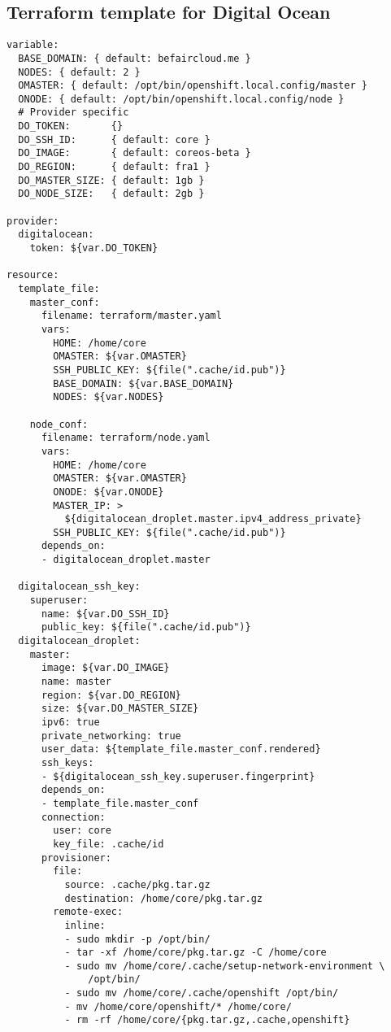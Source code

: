 \subsection{Terraform template for Digital
Ocean}\label{terraform-template-for-digital-ocean}

\begin{verbatim}
variable:
  BASE_DOMAIN: { default: befaircloud.me }
  NODES: { default: 2 }
  OMASTER: { default: /opt/bin/openshift.local.config/master }
  ONODE: { default: /opt/bin/openshift.local.config/node }
  # Provider specific
  DO_TOKEN:       {}
  DO_SSH_ID:      { default: core }
  DO_IMAGE:       { default: coreos-beta }
  DO_REGION:      { default: fra1 }
  DO_MASTER_SIZE: { default: 1gb }
  DO_NODE_SIZE:   { default: 2gb }

provider:
  digitalocean:
    token: ${var.DO_TOKEN}

resource:
  template_file:
    master_conf:
      filename: terraform/master.yaml
      vars:
        HOME: /home/core
        OMASTER: ${var.OMASTER}
        SSH_PUBLIC_KEY: ${file(".cache/id.pub")}
        BASE_DOMAIN: ${var.BASE_DOMAIN}
        NODES: ${var.NODES}

    node_conf:
      filename: terraform/node.yaml
      vars:
        HOME: /home/core
        OMASTER: ${var.OMASTER}
        ONODE: ${var.ONODE}
        MASTER_IP: >
          ${digitalocean_droplet.master.ipv4_address_private}
        SSH_PUBLIC_KEY: ${file(".cache/id.pub")}
      depends_on:
      - digitalocean_droplet.master

  digitalocean_ssh_key:
    superuser:
      name: ${var.DO_SSH_ID}
      public_key: ${file(".cache/id.pub")}
  digitalocean_droplet:
    master:
      image: ${var.DO_IMAGE}
      name: master
      region: ${var.DO_REGION}
      size: ${var.DO_MASTER_SIZE}
      ipv6: true
      private_networking: true
      user_data: ${template_file.master_conf.rendered}
      ssh_keys:
      - ${digitalocean_ssh_key.superuser.fingerprint}
      depends_on:
      - template_file.master_conf
      connection:
        user: core
        key_file: .cache/id
      provisioner:
        file:
          source: .cache/pkg.tar.gz
          destination: /home/core/pkg.tar.gz
        remote-exec:
          inline:
          - sudo mkdir -p /opt/bin/
          - tar -xf /home/core/pkg.tar.gz -C /home/core
          - sudo mv /home/core/.cache/setup-network-environment \
              /opt/bin/
          - sudo mv /home/core/.cache/openshift /opt/bin/
          - mv /home/core/openshift/* /home/core/
          - rm -rf /home/core/{pkg.tar.gz,.cache,openshift}


\end{verbatim}

